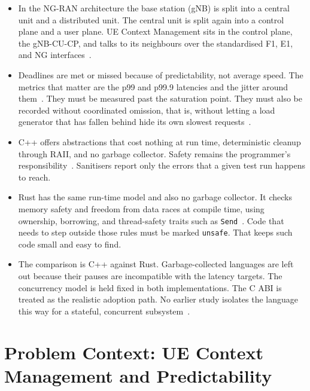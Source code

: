 \documentclass[english,twoside,openright,a4paper,censored,csm,software-track-2020]{HYthesisML}
\begin{document}
\begin{itemize}
  \item In the NG-RAN architecture the base station (gNB) is split into a central unit and a
        distributed unit. The central unit is split again into a control plane and a user plane.
        UE Context Management sits in the control plane, the gNB-CU-CP, and talks to its
        neighbours over the standardised F1, E1, and NG interfaces~\cite{3gpp38401}.
  \item Deadlines are met or missed because of predictability, not average speed. The metrics
        that matter are the p99 and p99.9 latencies and the jitter around
        them~\cite{dean2013tail}. They must be measured past the saturation point. They must also
        be recorded without coordinated omission, that is, without letting a load generator that
        has fallen behind hide its own slowest
        requests~\cite{schroeder2006openclosed,tene_hdrhistogram}.
  \item C++ offers abstractions that cost nothing at run time, deterministic cleanup through
        RAII, and no garbage collector. Safety remains the programmer's
        responsibility~\cite{szekeres2013sok}. Sanitisers report only the errors that a given
        test run happens to reach.
  \item Rust has the same run-time model and also no garbage collector. It checks memory safety
        and freedom from data races at compile time, using ownership, borrowing, and thread-safety
        traits such as \texttt{Send}~\cite{klabnik2023rust,jung2021safe}. Code that needs to
        step outside those rules must be marked \texttt{unsafe}. That keeps such code small and
        easy to find.
  \item The comparison is C++ against Rust. Garbage-collected languages are left out because
        their pauses are incompatible with the latency targets. The concurrency model is held
        fixed in both implementations. The C ABI is treated as the realistic adoption path. No
        earlier study isolates the language this way for a stateful, concurrent
        subsystem~\cite{karlback2021ran,emberg2023asn1}.
\end{itemize}

\chapter{Problem Context: UE Context Management and Predictability\label{chapter:context}}
\end{document}

